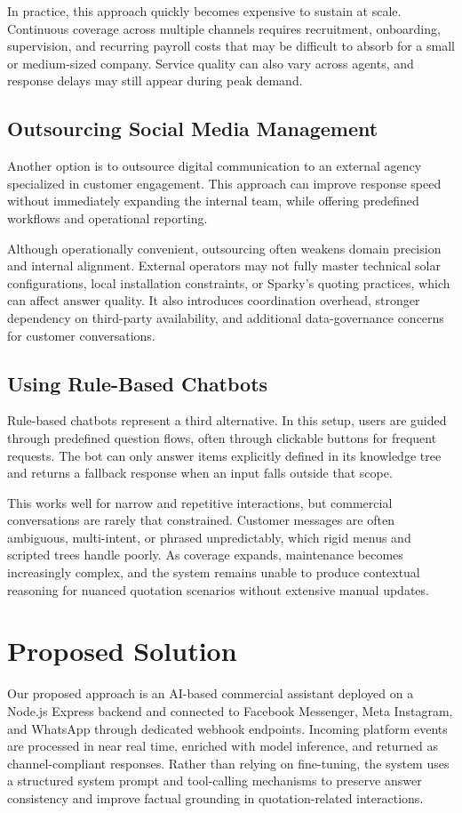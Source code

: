 In practice, this approach quickly becomes expensive to sustain at scale. Continuous coverage across multiple channels requires recruitment, onboarding, supervision, and recurring payroll costs that may be difficult to absorb for a small or medium-sized company. Service quality can also vary across agents, and response delays may still appear during peak demand.
\subsection{Outsourcing Social Media Management}
Another option is to outsource digital communication to an external agency specialized in customer engagement. This approach can improve response speed without immediately expanding the internal team, while offering predefined workflows and operational reporting.

Although operationally convenient, outsourcing often weakens domain precision and internal alignment. External operators may not fully master technical solar configurations, local installation constraints, or Sparky's quoting practices, which can affect answer quality. It also introduces coordination overhead, stronger dependency on third-party availability, and additional data-governance concerns for customer conversations.
\subsection{Using Rule-Based Chatbots}
Rule-based chatbots represent a third alternative. In this setup, users are guided through predefined question flows, often through clickable buttons for frequent requests. The bot can only answer items explicitly defined in its knowledge tree and returns a fallback response when an input falls outside that scope.

This works well for narrow and repetitive interactions, but commercial conversations are rarely that constrained. Customer messages are often ambiguous, multi-intent, or phrased unpredictably, which rigid menus and scripted trees handle poorly. As coverage expands, maintenance becomes increasingly complex, and the system remains unable to produce contextual reasoning for nuanced quotation scenarios without extensive manual updates.



\section{Proposed Solution}
Our proposed approach is an AI-based commercial assistant deployed on a Node.js Express backend and connected to Facebook Messenger\cite{meta_messenger_platform_docs}, Meta Instagram\cite{meta_instagram_messaging_docs}, and WhatsApp\cite{meta_whatsapp_cloud_api_docs} through dedicated webhook endpoints. Incoming platform events are processed in near real time, enriched with model inference, and returned as channel-compliant responses. Rather than relying on fine-tuning, the system uses a structured system prompt and tool-calling mechanisms to preserve answer consistency and improve factual grounding in quotation-related interactions.

